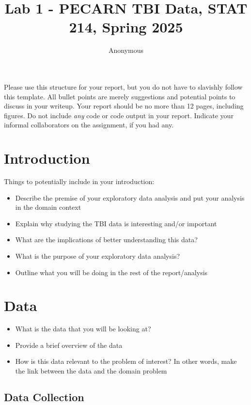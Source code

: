 \documentclass[10pt,letterpaper]{article}
\title{Lab 1 - PECARN TBI Data, STAT 214, Spring 2025}
\author{Anonymous}
\begin{document}
\maketitle

Please use this structure for your report, but you do not have to
slavishly follow this template. All bullet points are merely suggestions
and potential points to discuss in your writeup. Your report should be
no more than 12 pages, including figures. Do not include \emph{any} code
or code output in your report. Indicate your informal collaborators on
the assignment, if you had any.

\section{Introduction}\label{introduction}

Things to potentially include in your introduction:

\begin{itemize}
\item Describe the premise of your exploratory data analysis and put your analysis in the domain context
\item Explain why studying the TBI data is interesting and/or important
\item What are the implications of better understanding this data?
\item What is the purpose of your exploratory data analysis?
\item Outline what you will be doing in the rest of the report/analysis
\end{itemize}


\section{Data}\label{data}

\begin{itemize}
\item What is the data that you will be looking at?
\item Provide a brief overview of the data
\item How is this data relevant to the problem of interest? In other words, make the link between the data and the domain problem
\end{itemize}

\subsection{Data Collection}\label{data-collection}
\end{document}
